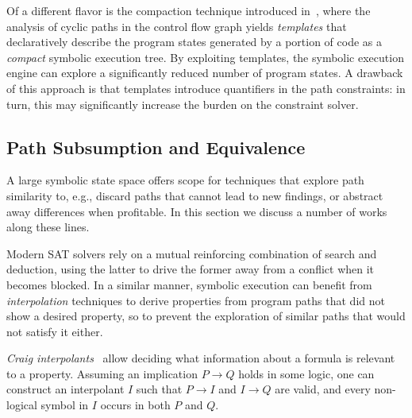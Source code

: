 Of a different flavor is the compaction technique introduced in~\cite{SST-ATVA13}, where the analysis of cyclic paths in the control flow graph yields {\em templates} that declaratively describe the program states generated by a portion of code as a {\em compact} symbolic execution tree. By exploiting templates, the symbolic execution engine can explore a significantly reduced number of program states. A drawback of this approach is that templates introduce quantifiers in the path constraints: in turn, this may significantly increase the burden on the constraint solver.

\subsection{Path Subsumption and Equivalence} 
\label{ss:interpolation}

A large symbolic state space offers scope for techniques that explore path similarity to, e.g., discard paths that cannot lead to new findings, or abstract away differences when profitable. In this section we discuss a number of works along these lines.

Modern SAT solvers rely on a mutual reinforcing combination of search and deduction, using the latter to drive the former away from a conflict when it becomes blocked. In a similar manner, symbolic execution can benefit from {\em interpolation} techniques to derive properties from program paths that did not show a desired property, so to prevent the exploration of similar paths that would not satisfy it either.

{\em Craig interpolants}~\cite{Craig1957} allow deciding what information about a formula is relevant to a property. Assuming an implication $P\rightarrow Q$ holds in some logic, one can construct an interpolant $I$ such that $P\rightarrow I$ and $I\rightarrow Q$ are valid, and every non-logical symbol in $I$ occurs in both $P$ and $Q$. 

